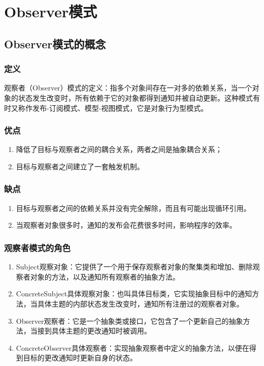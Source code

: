 \chapter{Observer模式}
\section{Observer模式的概念}
\subsection{定义}
观察者（Observer）模式的定义：指多个对象间存在一对多的依赖关系，当一个对象的状态发生改变时，所有依赖于它的对象都得到通知并被自动更新。这种模式有时又称作发布-订阅模式、模型-视图模式，它是对象行为型模式。
\subsection{优点}
\begin{enumerate}
	\item 降低了目标与观察者之间的耦合关系，两者之间是抽象耦合关系；
	\item 目标与观察者之间建立了一套触发机制。
\end{enumerate}
\subsection{缺点}
\begin{enumerate}
	\item 目标与观察者之间的依赖关系并没有完全解除，而且有可能出现循环引用。
	\item 当观察者对象很多时，通知的发布会花费很多时间，影响程序的效率。
\end{enumerate}
\subsection{观察者模式的角色}
\begin{enumerate}
	\item Subject观察对象：它提供了一个用于保存观察者对象的聚集类和增加、删除观察者对象的方法，以及通知所有观察者的抽象方法。
	\item ConcreteSubject具体观察对象：也叫具体目标类，它实现抽象目标中的通知方法，当具体主题的内部状态发生改变时，通知所有注册过的观察者对象。
	\item Observer观察者：它是一个抽象类或接口，它包含了一个更新自己的抽象方法，当接到具体主题的更改通知时被调用。
	\item ConcreteObserver具体观察者：实现抽象观察者中定义的抽象方法，以便在得到目标的更改通知时更新自身的状态。
\end{enumerate}
